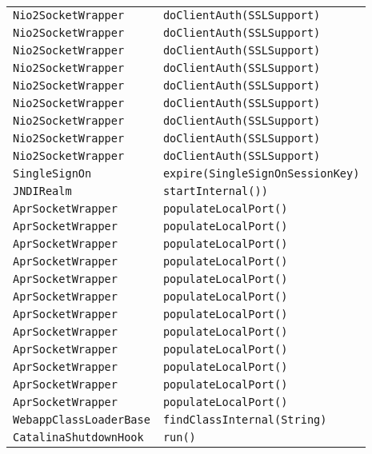 \begin{center}
\begin{longtable}{ll}
\lstinline/Nio2SocketWrapper/&{\lstinline/doClientAuth(SSLSupport)/}\\
\lstinline/Nio2SocketWrapper/&{\lstinline/doClientAuth(SSLSupport)/}\\
\lstinline/Nio2SocketWrapper/&{\lstinline/doClientAuth(SSLSupport)/}\\
\lstinline/Nio2SocketWrapper/&{\lstinline/doClientAuth(SSLSupport)/}\\
\lstinline/Nio2SocketWrapper/&{\lstinline/doClientAuth(SSLSupport)/}\\
\lstinline/Nio2SocketWrapper/&{\lstinline/doClientAuth(SSLSupport)/}\\
\lstinline/Nio2SocketWrapper/&{\lstinline/doClientAuth(SSLSupport)/}\\
\lstinline/Nio2SocketWrapper/&{\lstinline/doClientAuth(SSLSupport)/}\\
\lstinline/Nio2SocketWrapper/&{\lstinline/doClientAuth(SSLSupport)/}\\
\lstinline/SingleSignOn/&{\lstinline/expire(SingleSignOnSessionKey)/}\\
\lstinline/JNDIRealm/&{\lstinline/startInternal())/}\\
\lstinline/AprSocketWrapper/&{\lstinline/populateLocalPort()/}\\
\lstinline/AprSocketWrapper/&{\lstinline/populateLocalPort()/}\\
\lstinline/AprSocketWrapper/&{\lstinline/populateLocalPort()/}\\
\lstinline/AprSocketWrapper/&{\lstinline/populateLocalPort()/}\\
\lstinline/AprSocketWrapper/&{\lstinline/populateLocalPort()/}\\
\lstinline/AprSocketWrapper/&{\lstinline/populateLocalPort()/}\\
\lstinline/AprSocketWrapper/&{\lstinline/populateLocalPort()/}\\
\lstinline/AprSocketWrapper/&{\lstinline/populateLocalPort()/}\\
\lstinline/AprSocketWrapper/&{\lstinline/populateLocalPort()/}\\
\lstinline/AprSocketWrapper/&{\lstinline/populateLocalPort()/}\\
\lstinline/AprSocketWrapper/&{\lstinline/populateLocalPort()/}\\
\lstinline/AprSocketWrapper/&{\lstinline/populateLocalPort()/}\\
\lstinline/WebappClassLoaderBase/&{\lstinline/findClassInternal(String)/}\\
\lstinline/CatalinaShutdownHook/&{\lstinline/run()/}\\

\end{longtable}
\end{center}

